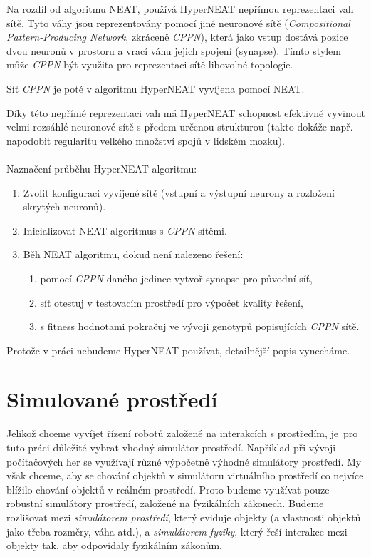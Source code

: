Na rozdíl od algoritmu NEAT, používá HyperNEAT nepřímou
reprezentaci vah sítě. Tyto váhy jsou reprezentovány pomocí jiné neuronové
sítě (\emph{Compositional Pattern-Producing Network}, zkráceně \emph{CPPN}),
která jako vstup dostává pozice dvou neuronů v prostoru a vrací váhu jejich
spojení (synapse). Tímto stylem může \emph{CPPN} být využita pro reprezentaci
sítě libovolné topologie. 

Síť \emph{CPPN} je poté v algoritmu HyperNEAT vyvíjena pomocí NEAT.

Díky této nepřímé reprezentaci vah má HyperNEAT schopnost efektivně vyvinout
velmi rozsáhlé neuronové sítě s předem určenou strukturou (takto dokáže např.
napodobit regularitu velkého množství spojů v lidském mozku).

\paragraph{}
Naznačení průběhu HyperNEAT algoritmu:
\begin{enumerate}
    \item Zvolit konfiguraci vyvíjené sítě (vstupní a výstupní neurony a
        rozložení skrytých neuronů).
    \item Inicializovat NEAT algoritmus s \emph{CPPN} sítěmi.
    \item Běh NEAT algoritmu, dokud není nalezeno řešení:
        \begin{enumerate}
            \item pomocí \emph{CPPN} daného jedince vytvoř synapse pro původní
                síť,
            \item síť otestuj v testovacím prostředí pro výpočet kvality
                řešení,
            \item s fitness hodnotami pokračuj ve vývoji genotypů popisujících
                \emph{CPPN} sítě.
        \end{enumerate}
\end{enumerate}

Protože v práci nebudeme HyperNEAT používat, detailnější popis vynecháme.

\section{Simulované prostředí} \label{Simulované prostředí}

Jelikož chceme vyvíjet řízení robotů založené na interakcích s prostředím,
je~pro tuto práci důležité vybrat vhodný simulátor prostředí. Například při
vývoji počítačových her se využívají různé výpočetně výhodné simulátory
prostředí. My však chceme, aby se chování objektů v simulátoru virtuálního
prostředí co nejvíce blížilo chování objektů v reálném prostředí. Proto budeme
využívat pouze robustní simulátory prostředí, založené na fyzikálních zákonech.
Budeme rozlišovat mezi \emph{simulátorem prostředí}, který eviduje objekty (a
vlastnosti objektů jako třeba rozměry, váha atd.), a \emph{simulátorem
fyziky}, který řeší interakce mezi objekty tak, aby odpovídaly fyzikálním
zákonům. 

